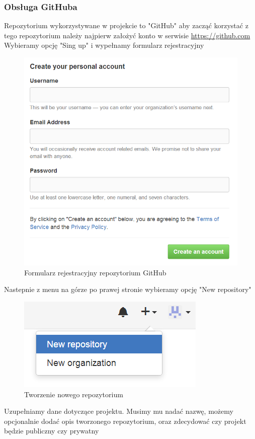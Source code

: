 \subsubsection{Obsługa GitHuba}
Repozytorium wykorzystywane w projekcie to "GitHub" aby zacząć korzystać z tego repozytorium należy najpierw założyć konto w serwisie \href{https://github.com}{https://github.com}
Wybieramy opcję "Sing up" i wypełnamy formularz rejestracyjny
\begin{figure}
	\centering
	\includegraphics {fig/rejestracja}
	\caption{Formularz rejestracyjny repozytorium GitHub}
	\label{fig:rejestracja}
\end{figure}
Nastepnie z menu na górze po prawej stronie wybieramy opcję "New repository"
\begin{figure}
	\centering
	\includegraphics{fig/new_project}
	\caption{Tworzenie nowego repozytorium}
	\label{fig:new_project}
\end{figure}
Uzupełniamy dane dotyczące projektu. Musimy mu nadać nazwę, możemy opcjonalnie dodać opis tworzonego repozytorium, oraz zdecydować czy projekt będzie publiczny czy prywatny

